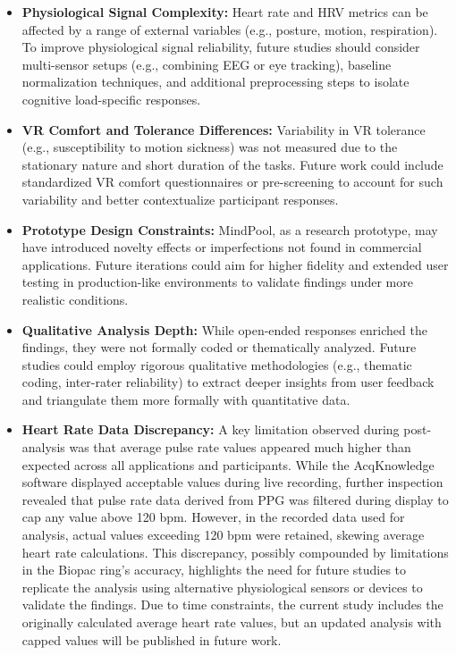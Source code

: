 \documentclass{CPP}
\begin{document}
\begin{itemize}
    \item \textbf{Physiological Signal Complexity:} Heart rate and HRV metrics can be affected by a range of external variables (e.g., posture, motion, respiration). To improve physiological signal reliability, future studies should consider multi-sensor setups (e.g., combining EEG or eye tracking), baseline normalization techniques, and additional preprocessing steps to isolate cognitive load-specific responses.

    \item \textbf{VR Comfort and Tolerance Differences:} Variability in VR tolerance (e.g., susceptibility to motion sickness) was not measured due to the stationary nature and short duration of the tasks. Future work could include standardized VR comfort questionnaires or pre-screening to account for such variability and better contextualize participant responses.

    \item \textbf{Prototype Design Constraints:} MindPool, as a research prototype, may have introduced novelty effects or imperfections not found in commercial applications. Future iterations could aim for higher fidelity and extended user testing in production-like environments to validate findings under more realistic conditions.

    \item \textbf{Qualitative Analysis Depth:} While open-ended responses enriched the findings, they were not formally coded or thematically analyzed. Future studies could employ rigorous qualitative methodologies (e.g., thematic coding, inter-rater reliability) to extract deeper insights from user feedback and triangulate them more formally with quantitative data.

    \item \textbf{Heart Rate Data Discrepancy:} A key limitation observed during post-analysis was that average pulse rate values appeared much higher than expected across all applications and participants. While the AcqKnowledge software displayed acceptable values during live recording, further inspection revealed that pulse rate data derived from PPG was filtered during display to cap any value above 120 bpm. However, in the recorded data used for analysis, actual values exceeding 120 bpm were retained, skewing average heart rate calculations. This discrepancy, possibly compounded by limitations in the Biopac ring’s accuracy, highlights the need for future studies to replicate the analysis using alternative physiological sensors or devices to validate the findings. Due to time constraints, the current study includes the originally calculated average heart rate values, but an updated analysis with capped values will be published in future work.


\end{itemize}
\end{document}
